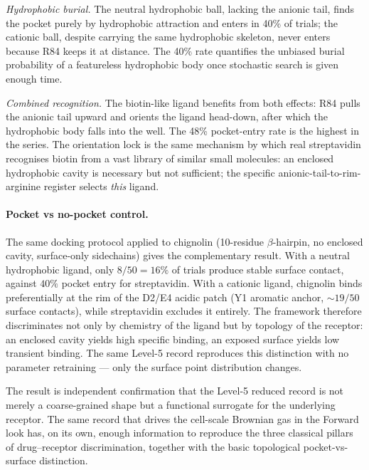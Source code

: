 \documentclass[11pt]{article}
\begin{document}
\emph{Hydrophobic burial.} The neutral hydrophobic ball, lacking the anionic tail, finds the pocket purely by hydrophobic attraction and enters in 40\% of trials; the cationic ball, despite carrying the same hydrophobic skeleton, never enters because R84 keeps it at distance. The 40\% rate quantifies the unbiased burial probability of a featureless hydrophobic body once stochastic search is given enough time.

\emph{Combined recognition.} The biotin-like ligand benefits from both effects: R84 pulls the anionic tail upward and orients the ligand head-down, after which the hydrophobic body falls into the well. The 48\% pocket-entry rate is the highest in the series. The orientation lock is the same mechanism by which real streptavidin recognises biotin from a vast library of similar small molecules: an enclosed hydrophobic cavity is necessary but not sufficient; the specific anionic-tail-to-rim-arginine register selects \emph{this} ligand.

\paragraph{Pocket vs no-pocket control.}
The same docking protocol applied to chignolin (10-residue $\beta$-hairpin, no enclosed cavity, surface-only sidechains) gives the complementary result. With a neutral hydrophobic ligand, only $8/50 = 16\%$ of trials produce stable surface contact, against $40\%$ pocket entry for streptavidin. With a cationic ligand, chignolin binds preferentially at the rim of the D2/E4 acidic patch (Y1 aromatic anchor, $\sim 19/50$ surface contacts), while streptavidin excludes it entirely. The framework therefore discriminates not only by chemistry of the ligand but by topology of the receptor: an enclosed cavity yields high specific binding, an exposed surface yields low transient binding. The same Level-5 record reproduces this distinction with no parameter retraining --- only the surface point distribution changes.

The result is independent confirmation that the Level-5 reduced record is not merely a coarse-grained shape but a functional surrogate for the underlying receptor. The same record that drives the cell-scale Brownian gas in the Forward look has, on its own, enough information to reproduce the three classical pillars of drug--receptor discrimination, together with the basic topological pocket-vs-surface distinction.
\end{document}
